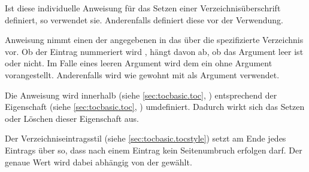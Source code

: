 \begin{Declaration}
\end{Declaration}
Ist diese individuelle Anweisung für das Setzen einer Verzeichnisüberschrift
definiert, so verwendet 
sie. Anderenfalls definiert  diese
vor der Verwendung.%
\EndIndexGroup


\begin{Declaration}
\end{Declaration}
Anweisung
 nimmt einen  der angegebenen
 in das über die  spezifizierte
Verzeichnis vor. Ob der Eintrag nummeriert wird%
, hängt davon ab, ob das Argument  leer ist oder
nicht. Im Falle eines leeren Argument wird dem  ein
 ohne Argument vorangestellt. Anderenfalls wird wie
gewohnt  mit  als
Argument verwendet.

Die Anweisung  wird innerhalb
 (siehe \autoref{sec:tocbasic.toc},
) entsprechend der Eigenschaft
 (siehe \autoref{sec:tocbasic.toc},
) umdefiniert. Dadurch wirkt sich das
Setzen oder Löschen dieser Eigenschaft  %
aus.%
%
\EndIndexGroup


\begin{Declaration}
\end{Declaration}
Der Verzeichniseintragsstil
 (siehe \autoref{sec:tocbasic.tocstyle}) setzt am Ende jedes
Eintrags über   so, dass
nach einem Eintrag kein Seitenumbruch erfolgen darf. Der genaue Wert wird
dabei abhängig von der  gewählt.

